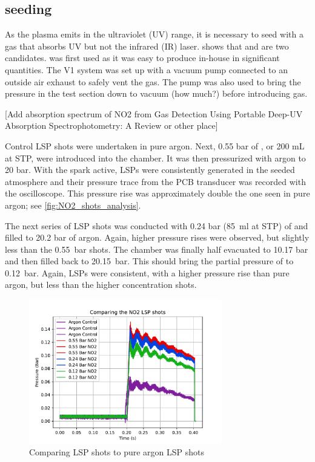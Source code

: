         
        
        \subsection{ seeding}
            
            As the plasma emits in the ultraviolet (UV) range, it is necessary to seed with a gas that absorbs UV but not the infrared (IR) laser. \textcite{khanGasDetectionUsing2019} shows that  and  are two candidates.  was first used as it was easy to produce in-house in significant quantities. The V1 system was set up with a vacuum pump connected to an outside air exhaust to safely vent the  gas. The pump was also used to bring the pressure in the test section down to vacuum (how much?) before introducing gas.

            [Add absorption spectrum of NO2 from Gas Detection Using Portable Deep-UV Absorption Spectrophotometry: A Review or other place]

            Control LSP shots were undertaken in pure argon. Next, 0.55 bar of , or 200 mL at STP, were introduced into the chamber. It was then pressurized with argon to 20 bar. With the spark active, LSPs were consistently generated in the seeded atmosphere and their pressure trace from the PCB transducer was recorded with the oscilloscope. This pressure rise was approximately double the one seen in pure argon; see \autoref{fig:NO2_shots_analysis}.

            The next series of LSP shots was conducted with 0.24 bar (\qty{85}{ml} at STP) of  and filled to 20.2 bar of argon. Again, higher pressure rises were observed, but slightly less than the \qty{0.55}{bar} shots. The chamber was finally half evacuated to 10.17 bar and then filled back to \qty{20.15}{bar}. This should bring the partial pressure of  to \qty{0.12}{bar}. Again, LSPs were consistent, with a higher pressure rise than pure argon, but less than the higher concentration  shots.

            \begin{figure}[!ht]
                \centering
                \includegraphics[width=0.75\textwidth]{assets/4 experiments/NO2_shots_analysis.pdf}
                \caption{Comparing  LSP shots to pure argon LSP shots}
                \label{fig:NO2_shots_analysis}
            \end{figure}

